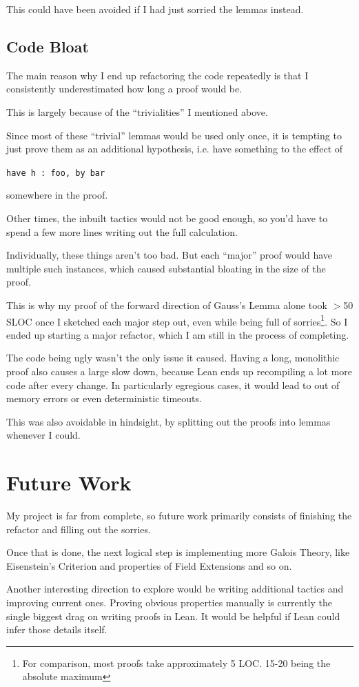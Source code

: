\documentclass[pagesize=a4]{scrreprt}
\begin{document}
This could have been avoided if I had just sorried the lemmas instead.

\section{Code Bloat}

The main reason why I end up refactoring the code repeatedly is that I consistently underestimated how long a proof would be. 

This is largely because of the ``trivialities'' I mentioned above. 

Since most of these ``trivial'' lemmas would be used only once, it is tempting to just prove them as an additional hypothesis, i.e. have something to the effect of 

\begin{center}
    \texttt{have h : foo, by bar}    
\end{center}

 somewhere in the proof. 
 
 Other times, the inbuilt tactics would not be good enough, so you'd have to spend a few more lines writing out the full calculation. 

 Individually, these things aren't too bad. But each ``major'' proof would have multiple such instances, which caused substantial bloating in the size of the proof.
 
 This is why my proof of the forward direction of Gauss's Lemma alone took $>$50 SLOC once I sketched each major step out, even while being full of sorries\footnote{For comparison, most proofs take approximately 5 LOC. 15-20 being the absolute maximum}. So I ended up starting a major refactor, which I am still in the process of completing. 

The code being ugly wasn't the only issue it caused. Having a long, monolithic proof also causes a large slow down, because Lean ends up recompiling a lot more code after every change. In particularly egregious cases, it would lead to out of memory errors or even deterministic timeouts. 

 This was also avoidable in hindsight, by splitting out the proofs into lemmas whenever I could. 

 \nopagebreak


\chapter{Future Work}

My project is far from complete, so future work primarily consists of finishing the refactor and filling out the sorries. 

Once that is done, the next logical step is implementing more Galois Theory, like Eisenstein's Criterion and properties of Field Extensions and so on. 

Another interesting direction to explore would be writing additional tactics and improving current ones. Proving obvious properties manually is currently the single biggest drag on writing proofs in Lean. It would be helpful if Lean could infer those details itself.
\end{document}
